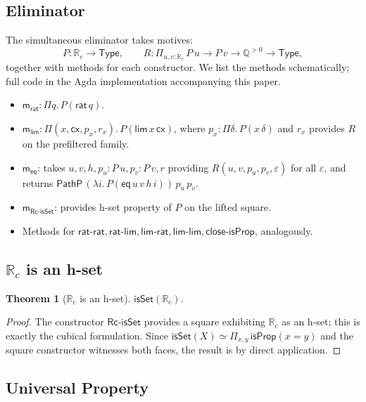 \documentclass[12pt]{article}
\newtheorem{theorem}{Theorem}[section]
\theoremstyle{definition}
\theoremstyle{remark}
\newcommand{\Type}{\mathsf{Type}}
\newcommand{\Q}{\mathbb{Q}}
\newcommand{\Rc}{\mathbb{R}_{c}}
\newcommand{\eqv}{\simeq}
\newcommand{\PathP}{\mathsf{PathP}}
\newcommand{\rat}{\mathsf{rat}}
\newcommand{\hlim}{\mathsf{lim}}
\newcommand{\isProp}{\mathsf{isProp}}
\newcommand{\isSet}{\mathsf{isSet}}
\begin{document}
\subsection{Eliminator}

The simultaneous eliminator takes motives:
\[
P : \Rc \to \Type, \qquad
R : \Pi_{u, v : \Rc}\, P\,u \to P\,v \to \Q^{>0} \to \Type,
\]
together with methods for each constructor. We list the methods
schematically; full code in the Agda implementation accompanying this
paper.

\begin{itemize}
\item $\mathsf{m_{rat}} : \Pi q.\, P(\rat\,q)$.
\item $\mathsf{m_{lim}} : \Pi(x, \mathsf{cx}, p_x, r_x).\, P(\hlim\,x\,\mathsf{cx})$,
where $p_x : \Pi\delta.\, P(x\,\delta)$ and $r_x$ provides $R$ on the
prefiltered family.
\item $\mathsf{m_{eq}}$: takes $u, v, h, p_u : P\,u, p_v : P\,v, r$ providing
$R(u,v,p_u,p_v,\varepsilon)$ for all $\varepsilon$, and returns
$\PathP\,(\lambda i.\, P(\mathsf{eq}\,u\,v\,h\,i))\,p_u\,p_v$.
\item $\mathsf{m_{Rc\text{-}isSet}}$: provides h-set property of $P$ on the lifted
square.
\item Methods for $\mathsf{rat\text{-}rat}, \mathsf{rat\text{-}lim},
\mathsf{lim\text{-}rat}, \mathsf{lim\text{-}lim}, \mathsf{close\text{-}isProp}$,
analogously.
\end{itemize}

\subsection{\texorpdfstring{$\Rc$}{Rc} is an h-set}

\begin{theorem}[$\Rc$ is an h-set]
\label{thm:Rc-isSet}
$\isSet(\Rc)$.
\end{theorem}
\begin{proof}
The constructor $\mathsf{Rc\text{-}isSet}$ provides a square exhibiting
$\Rc$ as an h-set; this is exactly the cubical formulation. Since
$\isSet(X) \eqv \Pi_{x, y}\, \isProp(x = y)$ and the square constructor
witnesses both faces, the result is by direct application.
\end{proof}

\subsection{Universal Property}
\end{document}
